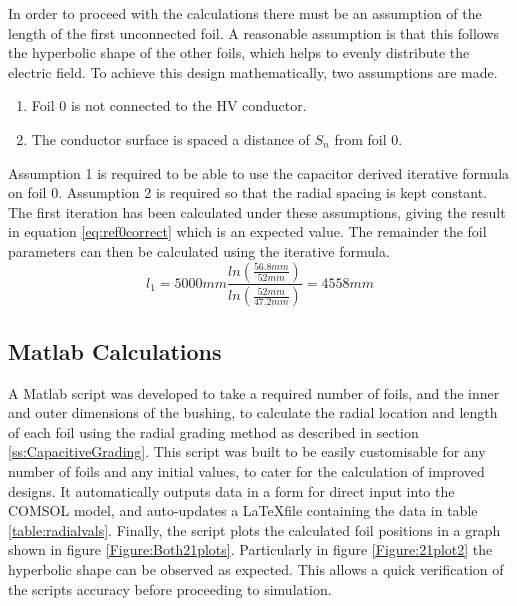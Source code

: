 In order to proceed with the calculations there must be an assumption of the length of the first unconnected foil.
A reasonable assumption is that this follows the hyperbolic shape of the other foils, which helps to evenly distribute the electric field.
To achieve this design mathematically, two assumptions are made.
\begin{enumerate}
\item Foil 0 is not connected to the HV conductor.
\item The conductor surface is spaced a distance of $S_n$ from foil 0.
\end{enumerate}
Assumption 1 is required to be able to use the capacitor derived iterative formula on foil 0.
Assumption 2 is required so that the radial spacing is kept constant.
The first iteration has been calculated under these assumptions, giving the result in equation \ref{eq:ref0correct} which is an expected value.
The remainder the foil parameters can then be calculated using the iterative formula.
\begin{equation}
   \label{eq:ref0correct}
   l_{1}
   = 5000mm\displaystyle\frac{{ln(\displaystyle\frac{56.8mm}{52mm})} }{ln(\displaystyle\frac{52mm}{47.2mm})}
   = 4558mm
\end{equation}

\subsection{Matlab Calculations}
A Matlab script was developed to take a required number of foils, and the inner and outer dimensions of the bushing, to calculate the radial location and length of each foil using the radial grading method as described in section \ref{ss:CapacitiveGrading}.
This script was built to be easily customisable for any number of foils and any initial values, to cater for the calculation of improved designs.
It automatically outputs data in a form for direct input into the COMSOL model, and auto-updates a \LaTeX  file containing the data in table \ref{table:radialvals}.
Finally, the script plots the calculated foil positions in a graph shown in figure \ref{Figure:Both21plots}.
Particularly in figure \ref{Figure:21plot2} the hyperbolic shape can be observed as expected.
This allows a quick verification of the scripts accuracy before proceeding to simulation.



